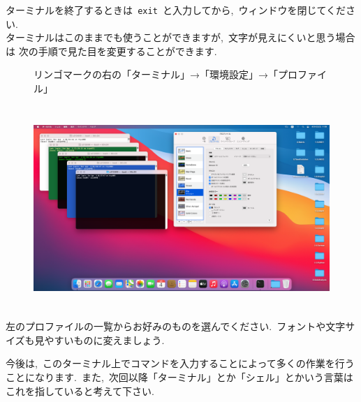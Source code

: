 \documentclass{jarticle}
\begin{document}
ターミナルを終了するときは\verb| exit |と入力してから,\ ウィンドウを閉じてください.\\

ターミナルはこのままでも使うことができますが,\ 文字が見えにくいと思う場合は
次の手順で見た目を変更することができます.\ 
\begin{figure}[H]
  \centering
  リンゴマークの右の「ターミナル」→「環境設定」→「プロファイル」\\
  \ \\
  \includegraphics[height=7.5cm]{fig/MacTerminalSetting.png}
\end{figure}
左のプロファイルの一覧からお好みのものを選んでください.\ フォントや文字サイズも見やすいものに変えましょう.\ 

今後は,\ このターミナル上でコマンドを入力することによって多くの作業を行うことになります.\ 
また,\ 次回以降「ターミナル」とか「シェル」とかいう言葉はこれを指していると考えて下さい.\\ 

\end{document}
